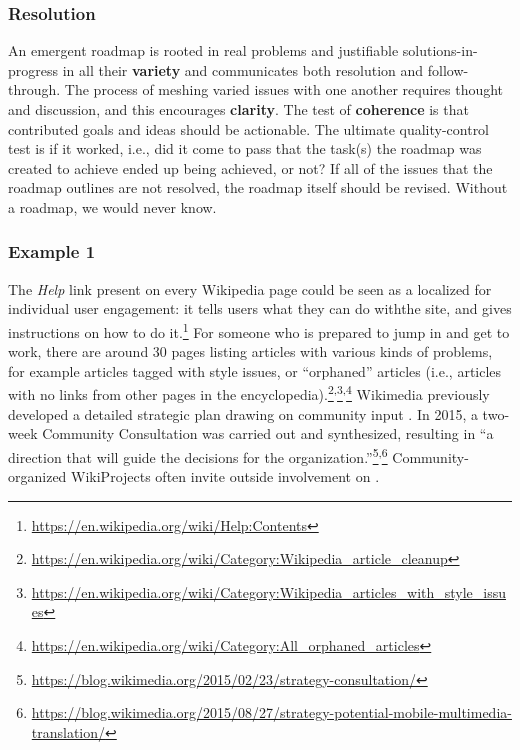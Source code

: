 \subsubsection*{Resolution}
An emergent roadmap is rooted in real problems and justifiable
solutions-in-progress in all their \textbf{variety} and communicates
both resolution and follow-through.  The process of meshing varied
issues with one another requires thought and discussion, and this
encourages \textbf{clarity}.  The test of \textbf{coherence} is that
contributed goals and ideas should be actionable.
%
The ultimate quality-control test is if it worked, i.e., did it come to pass that the task(s) the roadmap was created to achieve ended up being achieved, or not?  If all of the issues that the roadmap outlines are not resolved, the roadmap itself should be revised. Without a roadmap, we would never know.

\subsubsection*{Example 1}  The \emph{Help} link present on every Wikipedia page could be seen as a
localized  for individual user
engagement: it tells users what they can do withthe site, and gives instructions on how to do it.\footnote{\url{https://en.wikipedia.org/wiki/Help:Contents}}
For someone who is prepared to jump in and get to work, there are
around 30 pages listing articles with various kinds of problems, for
example articles tagged with style issues, or ``orphaned'' articles
(i.e., articles with no links from other pages in the
encyclopedia).\footnote{\url{https://en.wikipedia.org/wiki/Category:Wikipedia_article_cleanup}}\textsuperscript{,}\footnote{\url{https://en.wikipedia.org/wiki/Category:Wikipedia_articles_with_style_issues}}\textsuperscript{,}\footnote{\url{https://en.wikipedia.org/wiki/Category:All_orphaned_articles}}
%
%
Wikimedia previously developed
a detailed strategic plan drawing on community input
\cite{wikimedia2011plan}.  In 2015, a two-week 
Community Consultation was carried out and
synthesized, resulting in ``a direction that will guide the decisions for the organization.''\footnote{\url{https://blog.wikimedia.org/2015/02/23/strategy-consultation/}}\textsuperscript{,}\footnote{\url{https://blog.wikimedia.org/2015/08/27/strategy-potential-mobile-multimedia-translation/}}
%
%
 Community-organized WikiProjects often invite outside involvement on .

